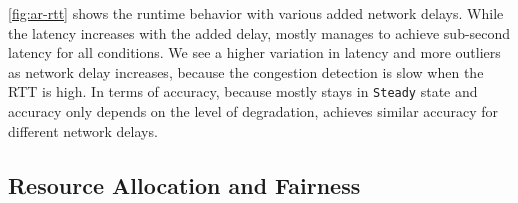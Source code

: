 \autoref{fig:ar-rtt} shows the runtime behavior with various added network
delays. While the latency increases with the added delay, \sysname{} mostly
manages to achieve sub-second latency for all conditions. We see a higher
variation in latency and more outliers as network delay increases, because the
congestion detection is slow when the RTT is high. In terms of accuracy, because
\sysname{} mostly stays in \texttt{Steady} state and accuracy only depends on
the level of degradation, \sysname{} achieves similar accuracy for different
network delays.

\subsection{Resource Allocation and Fairness}
\label{sec:multi-task-alloc}


